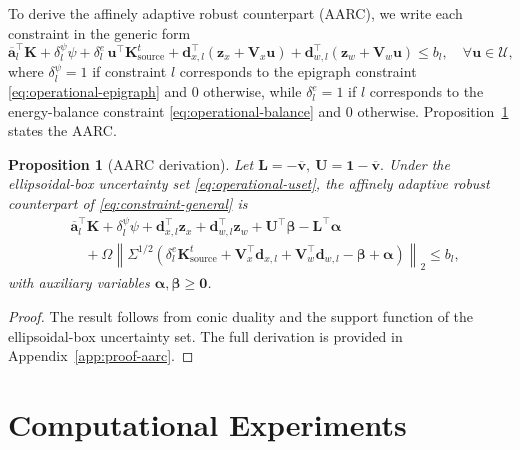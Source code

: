 \documentclass[11pt, letter]{article}
\newtheorem{proposition}[theorem]{Proposition}
\begin{document}
To derive the affinely adaptive robust counterpart (AARC), we write each
constraint in the generic form
\begin{equation}\label{eq:constraint-general}
\overline{\boldsymbol{a}}_l^\top \boldsymbol{K}
+
\delta_l^\psi \psi
+
\delta_l^e\,\boldsymbol{u}^\top
\boldsymbol{K}_{\mathrm{source}}^t
+
\boldsymbol{d}_{x,l}^\top
(\boldsymbol{z}_x+\boldsymbol{V}_x\boldsymbol{u})
+
\boldsymbol{d}_{w,l}^\top
(\boldsymbol{z}_w+\boldsymbol{V}_w\boldsymbol{u})
\le b_l,
\quad
\forall \boldsymbol{u}\in\mathcal U,
\end{equation}
where $\delta_l^\psi=1$ if constraint $l$ corresponds to the epigraph
constraint \eqref{eq:operational-epigraph} and $0$ otherwise,
while $\delta_l^e=1$ if $l$ corresponds to the energy-balance constraint
\eqref{eq:operational-balance} and $0$ otherwise. Proposition~\ref{prop:aarc} states the AARC.
\begin{proposition}[AARC derivation]\label{prop:aarc}
Let
\(\boldsymbol L=-\overline{\boldsymbol v}, \ \boldsymbol U=\boldsymbol 1-\overline{\boldsymbol v}.\)
Under the ellipsoidal-box uncertainty set
\eqref{eq:operational-uset}, the affinely adaptive robust counterpart of
\eqref{eq:constraint-general} is
\begin{align}
&
\overline{\boldsymbol a}_l^\top \boldsymbol K
+
\delta_l^\psi \psi
+
\boldsymbol d_{x,l}^\top \boldsymbol z_x
+
\boldsymbol d_{w,l}^\top \boldsymbol z_w
+
\boldsymbol U^\top\boldsymbol\beta
-
\boldsymbol L^\top\boldsymbol\alpha
\nonumber\\
&\quad
+
\Omega
\left\|
\Sigma^{1/2}
\left(
\delta_l^e
\boldsymbol K_{\mathrm{source}}^t
+
\boldsymbol V_x^\top\boldsymbol d_{x,l}
+
\boldsymbol V_w^\top\boldsymbol d_{w,l}
-
\boldsymbol\beta
+
\boldsymbol\alpha
\right)
\right\|_2
\le b_l,
\label{eq:aarc}
\end{align}
with auxiliary variables
$\boldsymbol\alpha,\boldsymbol\beta\ge\boldsymbol 0$.
\end{proposition}
\begin{proof}
The result follows from conic duality and the support function of the ellipsoidal-box uncertainty set. The full derivation is provided in Appendix~\ref{app:proof-aarc}.
\end{proof}


\section{Computational Experiments}\label{section:exp-results}
\end{document}
